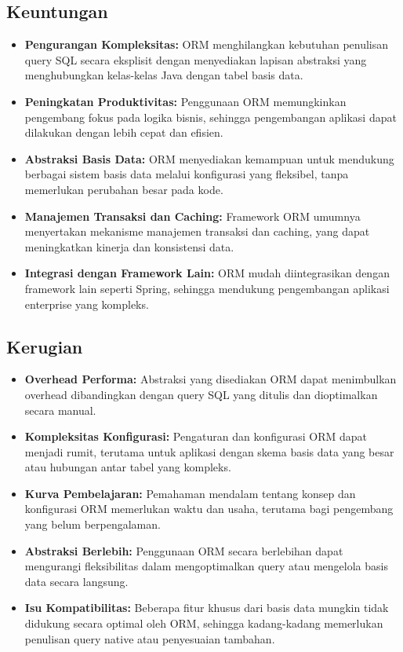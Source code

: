 \subsection{Keuntungan}
\begin{itemize}
	\item \textbf{Pengurangan Kompleksitas:} ORM menghilangkan kebutuhan penulisan query SQL secara eksplisit dengan menyediakan lapisan abstraksi yang menghubungkan kelas-kelas Java dengan tabel basis data.
	\item \textbf{Peningkatan Produktivitas:} Penggunaan ORM memungkinkan pengembang fokus pada logika bisnis, sehingga pengembangan aplikasi dapat dilakukan dengan lebih cepat dan efisien.
	\item \textbf{Abstraksi Basis Data:} ORM menyediakan kemampuan untuk mendukung berbagai sistem basis data melalui konfigurasi yang fleksibel, tanpa memerlukan perubahan besar pada kode.
	\item \textbf{Manajemen Transaksi dan Caching:} Framework ORM umumnya menyertakan mekanisme manajemen transaksi dan caching, yang dapat meningkatkan kinerja dan konsistensi data.
	\item \textbf{Integrasi dengan Framework Lain:} ORM mudah diintegrasikan dengan framework lain seperti Spring, sehingga mendukung pengembangan aplikasi enterprise yang kompleks.
\end{itemize}

\subsection{Kerugian}
\begin{itemize}
	\item \textbf{Overhead Performa:} Abstraksi yang disediakan ORM dapat menimbulkan overhead dibandingkan dengan query SQL yang ditulis dan dioptimalkan secara manual.
	\item \textbf{Kompleksitas Konfigurasi:} Pengaturan dan konfigurasi ORM dapat menjadi rumit, terutama untuk aplikasi dengan skema basis data yang besar atau hubungan antar tabel yang kompleks.
	\item \textbf{Kurva Pembelajaran:} Pemahaman mendalam tentang konsep dan konfigurasi ORM memerlukan waktu dan usaha, terutama bagi pengembang yang belum berpengalaman.
	\item \textbf{Abstraksi Berlebih:} Penggunaan ORM secara berlebihan dapat mengurangi fleksibilitas dalam mengoptimalkan query atau mengelola basis data secara langsung.
	\item \textbf{Isu Kompatibilitas:} Beberapa fitur khusus dari basis data mungkin tidak didukung secara optimal oleh ORM, sehingga kadang-kadang memerlukan penulisan query native atau penyesuaian tambahan.
\end{itemize}


